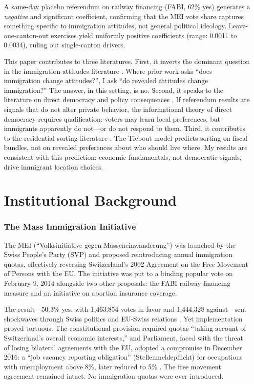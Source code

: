 \documentclass[12pt]{article}
\begin{document}
A same-day placebo referendum on railway financing (FABI, 62\% yes) generates a \textit{negative} and significant coefficient, confirming that the MEI vote share captures something specific to immigration attitudes, not general political ideology. Leave-one-canton-out exercises yield uniformly positive coefficients (range: 0.0011 to 0.0034), ruling out single-canton drivers.

This paper contributes to three literatures. First, it inverts the dominant question in the immigration-attitudes literature \citep{hainmueller2014, dustmann2007, alesina2023}. Where prior work asks ``does immigration change attitudes?'', I ask ``do revealed attitudes change immigration?'' The answer, in this setting, is no. Second, it speaks to the literature on direct democracy and policy consequences \citep{matsusaka2004, funk2010}. If referendum results are signals that do not alter private behavior, the informational theory of direct democracy \citep{frey1997} requires qualification: voters may learn local preferences, but immigrants apparently do not---or do not respond to them. Third, it contributes to the residential sorting literature \citep{tiebout1956, epple1984}. The Tiebout model predicts sorting on fiscal bundles, not on revealed preferences about who should live where. My results are consistent with this prediction: economic fundamentals, not democratic signals, drive immigrant location choices.

\section{Institutional Background}

\subsubsection*{The Mass Immigration Initiative} The MEI (``Volksinitiative gegen Masseneinwanderung'') was launched by the Swiss People's Party (SVP) and proposed reintroducing annual immigration quotas, effectively reversing Switzerland's 2002 Agreement on the Free Movement of Persons with the EU. The initiative was put to a binding popular vote on February 9, 2014 alongside two other proposals: the FABI railway financing measure and an initiative on abortion insurance coverage.

The result---50.3\% yes, with 1,463,854 votes in favor and 1,444,328 against---sent shockwaves through Swiss politics and EU-Swiss relations \citep{afonso2015}. Yet implementation proved tortuous. The constitutional provision required quotas ``taking account of Switzerland's overall economic interests,'' and Parliament, faced with the threat of losing bilateral agreements with the EU, adopted a compromise in December 2016: a ``job vacancy reporting obligation'' (Stellenmeldepflicht) for occupations with unemployment above 8\%, later reduced to 5\% \citep{piguet2019}. The free movement agreement remained intact. No immigration quotas were ever introduced.
\end{document}
